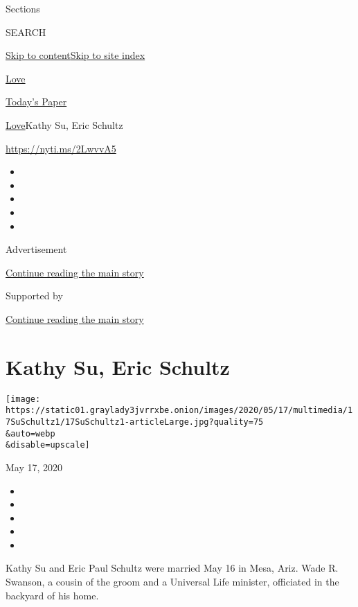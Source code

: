 Sections

SEARCH

\protect\hyperlink{site-content}{Skip to
content}\protect\hyperlink{site-index}{Skip to site index}

\href{https://www.nytimes3xbfgragh.onion/section/fashion/weddings}{Love}

\href{https://myaccount.nytimes3xbfgragh.onion/auth/login?response_type=cookie\&client_id=vi}{}

\href{https://www.nytimes3xbfgragh.onion/section/todayspaper}{Today's
Paper}

\href{/section/fashion/weddings}{Love}\textbar{}Kathy Su, Eric Schultz

\href{https://nyti.ms/2LwvvA5}{https://nyti.ms/2LwvvA5}

\begin{itemize}
\item
\item
\item
\item
\item
\end{itemize}

Advertisement

\protect\hyperlink{after-top}{Continue reading the main story}

Supported by

\protect\hyperlink{after-sponsor}{Continue reading the main story}

\hypertarget{kathy-su-eric-schultz}{%
\section{Kathy Su, Eric Schultz}\label{kathy-su-eric-schultz}}

\texttt{[image: https://static01.graylady3jvrrxbe.onion/images/2020/05/17/multimedia/17SuSchultz1/17SuSchultz1-articleLarge.jpg?quality=75\\\&auto=webp\\\&disable=upscale]}

May 17, 2020

\begin{itemize}
\item
\item
\item
\item
\item
\end{itemize}

Kathy Su and Eric Paul Schultz were married May 16 in Mesa, Ariz. Wade
R. Swanson, a cousin of the groom and a Universal Life minister,
officiated in the backyard of his home.

